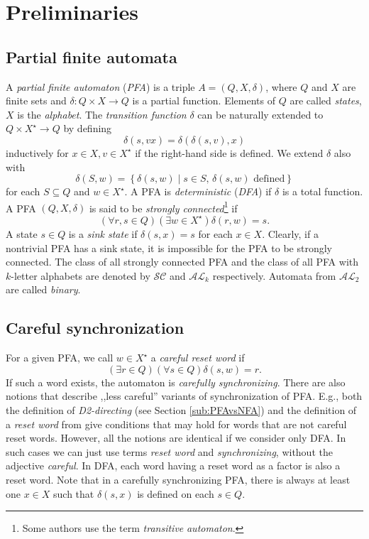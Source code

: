 \documentclass{ws-ijmpc}
\begin{document}
\section{Preliminaries\label{sec:Preliminaries}}


\subsection{Partial finite automata}

A \emph{partial finite automaton }(\emph{PFA})\emph{ }is a triple
$A=\left(Q,X,\delta\right)$, where $Q$ and $X$ are finite sets
and $\delta:Q\times X\rightarrow Q$ is a partial function. Elements
of $Q$ are called \emph{states}, $X$ is the \emph{alphabet}. The
\emph{transition function} $\delta$ can be naturally extended to
$Q\times X^{\star}\rightarrow Q$ by defining
\[
\delta\!\left(s,vx\right)=\delta\!\left(\delta\!\left(s,v\right),x\right)
\]
inductively for $x\in X,v\in X^{\star}$ if the right-hand side is
defined. We extend $\delta$ also with
\[
\delta\!\left(S,w\right)=\left\{ \delta\!\left(s,w\right)\mid s\in S\mbox{, }\delta\!\left(s,w\right)\mbox{ defined}\right\} 
\]
for each $S\subseteq Q$ and $w\in X^{\star}$. A PFA is \emph{deterministic}
(\emph{DFA}) if $\delta$ is a total function. A PFA $\left(Q,X,\delta\right)$
is said to be \emph{strongly connected}\footnote{Some authors use the term \emph{transitive} \emph{automaton}.}\emph{ }if
\[
\left(\forall r,s\in Q\right)\left(\exists w\in X^{\star}\right)\delta\!\left(r,w\right)=s.
\]
A state $s\in Q$ is a \emph{sink state }if $\delta\!\left(s,x\right)=s$
for each $x\in X$. Clearly, if a nontrivial PFA has a sink state,
it is impossible for the PFA to be strongly connected. The class of
all strongly connected PFA and the class of all PFA with $k$-letter
alphabets are denoted by $\mathcal{SC}$ and $\mathcal{AL}_{k}$ respectively.
Automata from $\mathcal{AL}_{2}$ are called \emph{binary}.


\subsection{Careful synchronization}

For a given PFA, we call $w\in X^{\star}$ a \emph{careful reset word}
if
\[
\left(\exists r\in Q\right)\left(\forall s\in Q\right)\delta\!\left(s,w\right)=r.
\]
If such a word exists, the automaton is \emph{carefully synchronizing}.
There are also notions that describe ,,less careful'' variants of
synchronization of PFA. E.g., both the definition of \emph{D2-directing}
(see Section \ref{sub:PFAvsNFA}) and the definition of a \emph{reset
word }from \citep{BER6} give conditions that may hold for words that
are not careful reset words. However, all the notions are identical
if we consider only DFA. In such cases we can just use terms \emph{reset
word} and \emph{synchronizing}, without the adjective \emph{careful}.
In DFA, each word having a reset word as a factor is also a reset
word. Note that in a carefully synchronizing PFA, there is always
at least one $x\in X$ such that $\delta\!\left(s,x\right)$ is defined
on each $s\in Q$.
\end{document}
